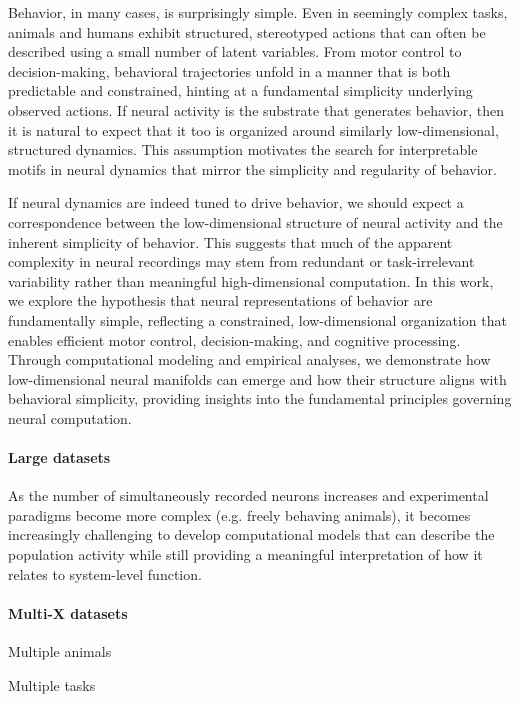\documentclass{article}
\theoremstyle{definition} \newtheorem{definition}{Definition}  \newtheorem{example}{Example}
\theoremstyle{remark} \newtheorem{remark}{Remark}
\newcounter{ct}
\begin{document}
Behavior, in many cases, is surprisingly simple. Even in seemingly complex tasks, animals and humans exhibit structured, stereotyped actions that can often be described using a small number of latent variables. From motor control to decision-making, behavioral trajectories unfold in a manner that is both predictable and constrained, hinting at a fundamental simplicity underlying observed actions.
If neural activity is the substrate that generates behavior, then it is natural to expect that it too is organized around similarly low-dimensional, structured dynamics. This assumption motivates the search for interpretable motifs in neural dynamics that mirror the simplicity and regularity of behavior.

If neural dynamics are indeed tuned to drive behavior, we should expect a correspondence between the low-dimensional structure of neural activity and the inherent simplicity of behavior.
 This suggests that much of the apparent complexity in neural recordings may stem from redundant or task-irrelevant variability rather than meaningful high-dimensional computation.
  In this work, we explore the hypothesis that neural representations of behavior are fundamentally simple, reflecting a constrained, low-dimensional organization that enables efficient motor control, decision-making, and cognitive processing.
 Through computational modeling and empirical analyses, we demonstrate how low-dimensional neural manifolds can emerge and how their structure aligns with behavioral simplicity, providing insights into the fundamental principles governing neural computation.
 
 
 
\paragraph{Large datasets}
 As the number of simultaneously recorded neurons increases and experimental paradigms become more complex (e.g. freely behaving animals), it becomes increasingly challenging to develop computational models that can describe the population activity while still providing a meaningful interpretation of how it relates to system-level function.


\paragraph{Multi-X datasets}
Multiple animals \citep{depasquale2021accumulation}

Multiple tasks \citep{}
\end{document}
